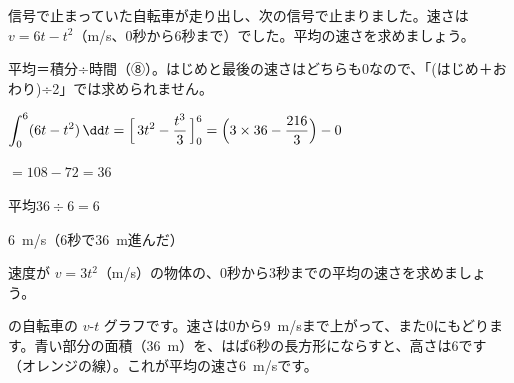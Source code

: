\begin{reidai}[変わる量の平均]
信号で止まっていた自転車が走り出し、次の信号で止まりました。速さは $v=6t-t^2$（m/s、0秒から6秒まで）でした。平均の速さを求めましょう。\par
\kangaekata 平均＝積分÷時間（⑧）。はじめと最後の速さはどちらも0なので、「(はじめ＋おわり)÷2」では求められません。\par
\shiki $\displaystyle\int_0^6(6t-t^2)\,\dd t=\Bigl[\,3t^2-\frac{t^3}{3}\,\Bigr]_0^6=\Bigl(3\times36-\frac{216}{3}\Bigr)-0$\par
\hspace*{2.6\zw}$=108-72=36$\par
\hspace*{2.6\zw}平均\quad $36\div6=6$\par
\kotae \qty{6}{m/s}（6秒で\qty{36}{m}進んだ）
\end{reidai}

\begin{jibun}
速度が $v=3t^2$（m/s）の物体の、0秒から3秒までの平均の速さを求めましょう。
\end{jibun}

\noindent\begin{minipage}[c]{0.48\linewidth}
\end{minipage}\hfill
\begin{minipage}[c]{0.5\linewidth}\raggedright
{}の自転車の $v$-$t$ グラフです。速さは0から\qty{9}{m/s}まで上がって、また0にもどります。青い部分の面積（\qty{36}{m}）を、はば6秒の長方形にならすと、高さは6です（オレンジの線）。これが平均の速さ\qty{6}{m/s}です。
\end{minipage}

